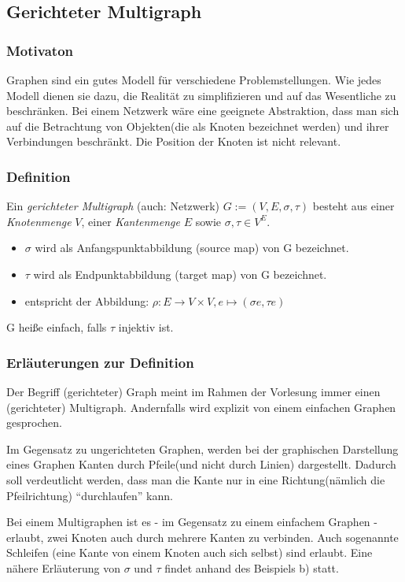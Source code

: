 \subsection{Gerichteter Multigraph}
\subsubsection{Motivaton}
Graphen sind ein gutes Modell für verschiedene Problemstellungen.
Wie jedes Modell dienen sie dazu, die Realität zu simplifizieren und auf das Wesentliche zu beschränken.
Bei einem Netzwerk wäre eine geeignete Abstraktion, dass man sich auf die Betrachtung von Objekten(die als Knoten bezeichnet werden) und ihrer Verbindungen beschränkt.
Die Position der Knoten ist nicht relevant.

\subsubsection{Definition}
Ein \emph{gerichteter Multigraph} (auch: Netzwerk) $G:= (V,E,\sigma,\tau) $ besteht aus einer \emph{Knotenmenge} $V$, einer \emph{Kantenmenge} $E$ sowie
$\sigma , \tau \in V^E $.
\begin{itemize}
\item $\sigma $ wird als Anfangspunktabbildung (source map) von G bezeichnet.
\item $\tau $ wird als Endpunktabbildung (target map) von G bezeichnet.
\item entspricht der Abbildung: $\rho : E \rightarrow V \times V, e \mapsto (\sigma e, \tau e) $
\end{itemize}
G heiße einfach, falls $\tau$ injektiv ist.

\subsubsection{Erläuterungen zur Definition}
Der Begriff (gerichteter) Graph meint im Rahmen der Vorlesung immer einen (gerichteter) Multigraph.
Andernfalls wird explizit von einem einfachen Graphen gesprochen.

Im Gegensatz zu ungerichteten Graphen, werden bei der graphischen Darstellung eines Graphen Kanten durch Pfeile(und nicht durch Linien) dargestellt.
Dadurch soll verdeutlicht werden, dass man die Kante nur in eine Richtung(nämlich die Pfeilrichtung) ``durchlaufen'' kann.

Bei einem Multigraphen ist es - im Gegensatz zu einem einfachem Graphen - erlaubt, zwei Knoten auch durch mehrere Kanten zu verbinden.
Auch sogenannte Schleifen (eine Kante von einem Knoten auch sich selbst) sind erlaubt.
Eine nähere Erläuterung von $\sigma$ und $\tau$ findet anhand des Beispiels b) statt.


